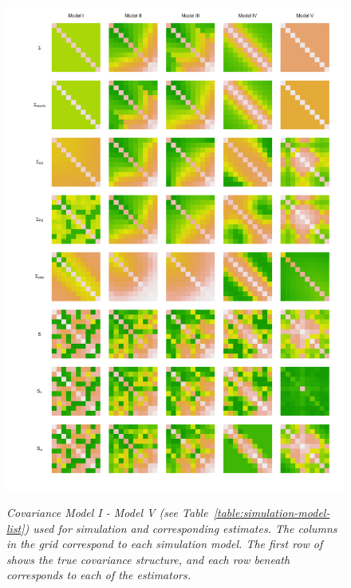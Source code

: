 \begin{figure}[H] 
\centering
\caption{\textit{Covariance Model I - Model V (see Table~\ref{table:simulation-model-list}) used for simulation and corresponding estimates. The columns in the grid correspond to each simulation model. The first row of shows the true covariance structure, and each row beneath corresponds to each of the estimators.}}
  \includegraphics[width = 1\textwidth]{img/chapter-4/cov-estimate-lattice}\label{fig:cov-estimate-lattice}
\end{figure}

